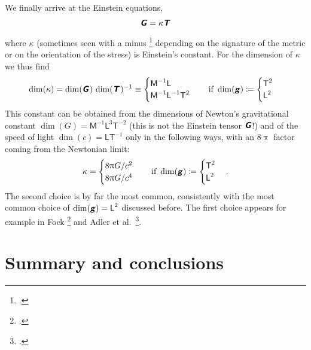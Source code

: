\documentclass[a4paper,12pt,onecolumn,oneside,article,british]{memoir}
\makeatletter
\newcommand*{\mathte}[1]{\textbf{\textit{\textsf{#1}}}}
\newcommand*{\citep}{\footcites}
\newcommand*{\pu}{\uppi}%
\newcommand*{\defd}{\coloneqq}
\newcommand*{\sect}{\S}%
\newcommand*{\eqn}{eq.}%
\newcommand*{\eqns}{eqs}%
\newcommand*{\eg}{{e.g.}}
\newcommand*{\etal}{{et al.}}
\newcommand*{\q}{}%
\DeclareRobustCommand*{\q}{%
  \mathbin{\mathpalette\bigcdot@{}}%
}
\newcommand*{\bigcdot@scalefactor}{0.7}
\newcommand*{\bigcdot@widthfactor}{1.5}
\newcommand*{\bigcdot@}[2]{%
  \sbox0{$#1\vcenter{}$}%
  \sbox2{$#1\cdot\m@th$}%
  \hbox to \bigcdot@widthfactor\wd2{%
    \hfil
    \raise\ht0\hbox{%
      \scalebox{\bigcdot@scalefactor}{%
        \lower\ht0\hbox{$#1\bullet\m@th$}%
      }%
    }%
    \hfil
  }%
}
\newcommand*{\Le}{\textsf{L}}
\newcommand*{\Ti}{\textsf{T}}
\newcommand*{\Ma}{\textsf{M}}
\newcommand*{\yg}{\mathte{g}}
\newcommand*{\yT}{\mathte{T}}
\newcommand*{\yG}{\mathte{G}}
\renewcommand*{\i}{\indices}
\newcommand*{\yk}{\kappa}
\makeatother
\begin{document}
We finally arrive at the Einstein equations,
\begin{equation}
  \label{eq:einstein}
  \yG%
  = \yk \yT%
\end{equation}
where $\yk$ (sometimes seen with a minus \citep[\eg][\sect~78
\eqn~(78.3)]{tolman1934_t1949}[\sect~52
\eqn~(52.06)]{fock1955_t1964}[\sect~14.2 \eqn~(14.8)]{rindler2001_r2006}
depending on the signature of the metric or on the orientation of the
stress) is Einstein's constant. For the dimension of $\yk$ we thus find
\begin{equation}
  \label{eq:dim_k_1}
  \dim(\yk) = \dim(\yG\i{_{\q}^{\q}}) \, \dim(\yT\i{_{\q}^{\q}})^{-1} \equiv
    \begin{cases}
    \Ma^{-1}\Le \\
    \Ma^{-1}\Le^{-1}\Ti^{2}
  \end{cases}
  \quad\text{if }\dim(\yg)\defd
  \begin{cases}
     \Ti^2 \\
    \Le^2
  \end{cases}
\end{equation}
This constant can be obtained from the dimensions of Newton's gravitational
constant $\dim(G)=\Ma^{-1}\Le^{3}\Ti^{-2}$ (this is not the Einstein tensor
$\yG$!) and of the speed of light $\dim(c)=\Le\Ti^{-1}$ only in the
following ways, with an $8\pu$ factor coming from the Newtonian limit:
\begin{equation}
  \label{eq:k_Gc}
  \yk =     \begin{cases}
   8\pu G/c^{2} \\
   8\pu G/c^{4}
  \end{cases}
  \quad\text{if }\dim(\yg)\defd
  \begin{cases}
     \Ti^2 \\
    \Le^2
  \end{cases}.
\end{equation}
The second choice is by far the most common, consistently with the most
common choice of $\dim(\yg)=\Le^{2}$ discussed before. The first choice
appears for example in Fock \citep[\sect~55 \eqns~(55.15)
and~(52.06)]{fock1955_t1964} and Adler \etal\ \citep[\sect~10.5
\eqn~(10.98)]{adleretal1965_r1975}.


\section{Summary and conclusions}
\label{sec:summary}
\end{document}
